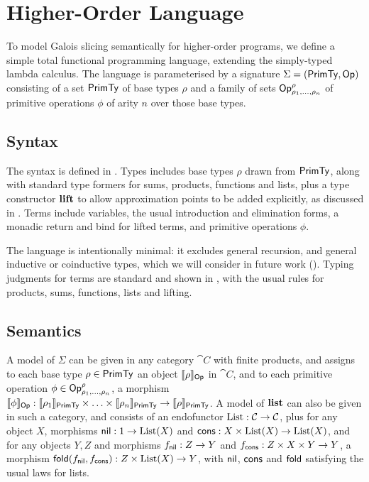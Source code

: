 \section{Higher-Order Language}
\label{sec:language}

To model Galois slicing semantically for higher-order programs, we define a simple total functional
programming language, extending the simply-typed lambda calculus. The language is parameterised by a signature
$\Sigma = (\mathsf{PrimTy}, \mathsf{Op})$ consisting of a set $\mathsf{PrimTy}$ of base types $\rho$ and a family of sets
$\mathsf{Op}^\rho_{\rho_1,\ldots,\rho_n}$ of primitive operations $\phi$ of arity $n$ over those base types.

\subsection{Syntax}
\label{sec:language:syntax}

The syntax is defined in . Types includes base types $\rho$ drawn from $\mathsf{PrimTy}$, along with
standard type formers for sums, products, functions and lists, plus a type constructor $\mathbf{lift}$ to allow
approximation points to be added explicitly, as discussed in . Terms include
variables, the usual introduction and elimination forms, a monadic return and bind for lifted terms, and
primitive operations $\phi$.

The language is intentionally minimal: it excludes general recursion, and general inductive or coinductive
types, which we will consider in future work (). Typing judgments for terms are standard
and shown in , with the usual rules for products, sums, functions, lists and lifting.




\subsection{Semantics}
\label{sec:language:semantics}



A model of $\Sigma$ can be given in any category $\cat{C}$ with finite products, and assigns to each base type
$\rho \in \mathsf{PrimTy}$ an object $\llbracket \rho \rrbracket_{\mathsf{Op}}$ in $\cat{C}$, and to each primitive operation $\phi \in
\mathsf{Op}^\rho_{\rho_1,\ldots,\rho_n}$, a morphism $\llbracket \phi \rrbracket_{\mathsf{Op}}: \llbracket \rho_1 \rrbracket_{\mathsf{PrimTy}} \times \ldots
\times \llbracket \rho_n \rrbracket_{\mathsf{PrimTy}} \to \llbracket \rho \rrbracket_{\mathsf{PrimTy}}$. A model of $\mathbf{list}$ can also be given in such a
category, and consists of an endofunctor $\mathrm{List}: \mathcal{C} \to \mathcal{C}$, plus for any object $X$, morphisms
$\mathsf{nil}: 1 \to \mathrm{List}(X)$ and $\mathsf{cons}: X \times \mathrm{List}(X) \to \mathrm{List}(X)$, and for any objects $Y, Z$ and morphisms
$f_{\mathsf{nil}}: Z \to Y$ and $f_{\mathsf{cons}}: Z \times X \times Y \to Y$, a morphism $\mathsf{fold}(f_{\mathsf{nil}},f_{\mathsf{cons}}): Z \times
\mathrm{List}(X) \to Y$, with $\mathsf{nil}$, $\mathsf{cons}$ and $\mathsf{fold}$ satisfying the usual laws for lists.

